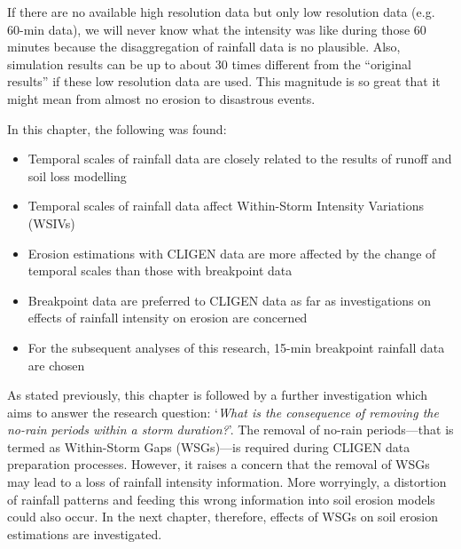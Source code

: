 If there are no available high resolution data but only low resolution
data (e.g. 60-min data), we will never know what the intensity was like
during those 60 minutes because the disaggregation of rainfall data is no
plausible. Also, simulation results can be up to about 30 times different from
the ``original results'' if these low resolution data are used. This magnitude
is so great that it might mean from almost no erosion to disastrous events.

In this chapter, the following was found:
\begin{itemize}
  \item Temporal scales of rainfall data are closely related to the results of
runoff and soil loss modelling
  \item Temporal scales of rainfall data affect Within-Storm Intensity
Variations (WSIVs)
  \item Erosion estimations with CLIGEN data are more affected by the change of
temporal scales than those with breakpoint data
  \item Breakpoint data are preferred to CLIGEN data as far as investigations
on effects of rainfall intensity on erosion are concerned
  \item For the subsequent analyses of this research, 15-min breakpoint rainfall
data are chosen
\end{itemize}

As stated previously, this chapter is followed by a further investigation which
aims to answer the research question: `\textit{What is the consequence of
removing the no-rain periods within a storm duration?}'. The removal of no-rain
periods---that is termed as Within-Storm Gaps (WSGs)---is required during
CLIGEN data preparation processes. However, it raises a concern that the removal
of WSGs may lead to a loss of rainfall intensity information. More worryingly,
a distortion of rainfall patterns and feeding this wrong information into soil
erosion models could also occur. In the next chapter, therefore, effects of
WSGs on soil erosion estimations are investigated.



